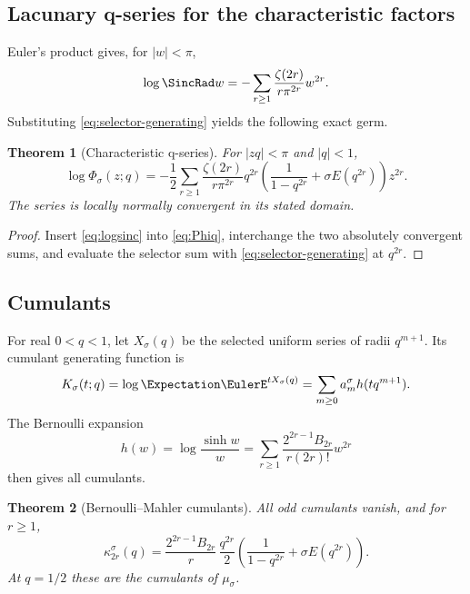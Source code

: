 \documentclass[11pt,oneside]{article}
\numberwithin{equation}{section}
\newtheorem{theorem}{Theorem}[section]
\theoremstyle{definition}
\theoremstyle{remark}
\begin{document}
\subsection{Lacunary q-series for the characteristic factors}

Euler's product gives, for $|w|<\pi$,
\begin{equation}
 \log\SincRad w=-\sum_{r\ge1}\frac{\zeta(2r)}{r\pi^{2r}}w^{2r}.
 \label{eq:logsinc}
\end{equation}
Substituting \eqref{eq:selector-generating} yields the following exact germ.

\begin{theorem}[Characteristic q-series]
\label{thm:characteristic-q-series}
For $|zq|<\pi$ and $|q|<1$,
\begin{equation}
 \log\Phi_\sigma(z;q)
 =-\frac12\sum_{r\ge1}\frac{\zeta(2r)}{r\pi^{2r}}
 q^{2r}\left(\frac1{1-q^{2r}}+\sigma E(q^{2r})\right)z^{2r}.
 \label{eq:log-Phiq}
\end{equation}
The series is locally normally convergent in its stated domain.
\end{theorem}

\begin{proof}
Insert \eqref{eq:logsinc} into \eqref{eq:Phiq}, interchange the two absolutely convergent
sums, and evaluate the selector sum with \eqref{eq:selector-generating} at $q^{2r}$.
\end{proof}

\subsection{Cumulants}

For real $0<q<1$, let $X_\sigma(q)$ be the selected uniform series of radii $q^{m+1}$.
Its cumulant generating function is
\begin{equation}
 K_\sigma(t;q)=\log\Expectation\EulerE^{tX_\sigma(q)}
 =\sum_{m\ge0}a_m^\sigma h(tq^{m+1}).
 \label{eq:Kq}
\end{equation}
The Bernoulli expansion
\begin{equation}
 h(w)=\log\frac{\sinh w}{w}
 =\sum_{r\ge1}\frac{2^{2r-1}B_{2r}}{r(2r)!}w^{2r}
 \label{eq:h-Bernoulli}
\end{equation}
then gives all cumulants.

\begin{theorem}[Bernoulli--Mahler cumulants]
\label{thm:cumulants}
All odd cumulants vanish, and for $r\ge1$,
\begin{equation}
 \boxed{\quad
 \kappa_{2r}^{\sigma}(q)
 =\frac{2^{2r-1}B_{2r}}{r}\,
 \frac{q^{2r}}2
 \left(\frac1{1-q^{2r}}+\sigma E(q^{2r})\right).
 \quad}
 \label{eq:cumulant-formula}
\end{equation}
At $q=1/2$ these are the cumulants of $\mu_\sigma$.
\end{theorem}
\end{document}
